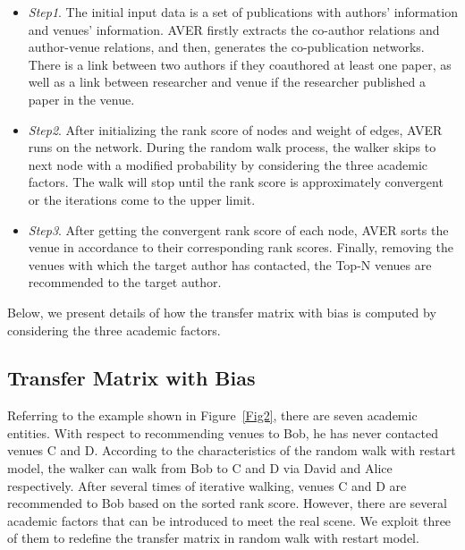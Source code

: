 \documentclass[9pt]{acm_proc_article-sp}
\begin{document}
\begin{itemize}
  \item \emph{Step1}. The initial input data is a set of publications with authors' information and venues' information. AVER firstly extracts the co-author relations and author-venue relations, and then, generates the co-publication networks. There is a link between two authors if they coauthored at least one paper, as well as a link between researcher and venue if the researcher published a paper in the venue.
  \item \emph{Step2}. After initializing the rank score of nodes and weight of edges, AVER runs on the network. During the random walk process, the walker skips to next node with a modified probability by considering the three academic factors. The walk will stop until the rank score is approximately convergent or the iterations come to the upper limit.
  \item \emph{Step3}. After getting the convergent rank score of each node, AVER sorts the venue in accordance to their corresponding rank scores. Finally, removing the venues with which the target author has contacted, the Top-N venues are recommended to the target author.
\end{itemize}

Below, we present details of how the transfer matrix with bias is computed by considering the three academic factors.

\subsection{Transfer Matrix with Bias}
Referring to the example shown in Figure~\ref{Fig2}, there are seven academic entities. With respect to recommending venues to Bob, he has never contacted venues C and D. According to the characteristics of the random walk with restart model, the walker can walk from Bob to C and D via David and Alice respectively. After several times of iterative walking, venues C and D are recommended to Bob based on the sorted rank score. However, there are several academic factors that can be introduced to meet the real scene. We exploit three of them to redefine the transfer matrix in random walk with restart model.
\end{document}
